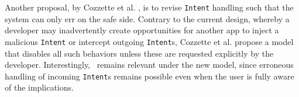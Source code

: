 Another proposal, by Cozzette et al. \cite{CLMOABFKNR:IM13}, is to revise {\tt Intent} handling such that the system can only err on the safe side. Contrary to the current design, whereby a developer may inadvertently create opportunities for another app to inject a malicious {\tt Intent} or intercept outgoing {\tt Intent}s, Cozzette et al. propose a model that disables all such behaviors unless these are requested explicitly by the developer. Interestingly, \Tool\ remains relevant under the new model, since erroneous handling of incoming {\tt Intent}s remains possible even when the user is fully aware of the implications.

%
%
%
%
%
%
